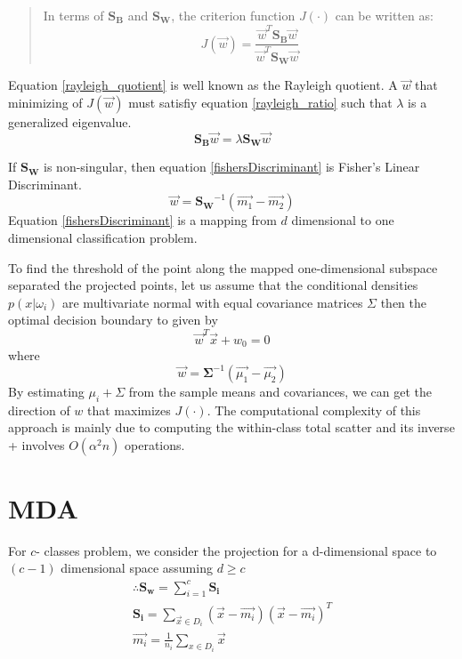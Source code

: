 \documentclass[11pt]{article}
\begin{document}
\begin{quote}
	In terms of $\mathbf{S_B}$ and $\mathbf{S_W}$, the criterion function $J(\cdot)$ can be written as:
	\begin{equation}
		J(\vec{w}) = \frac{\vec{w}^T \mathbf{S_B} \vec{w} } { \vec{w}^T \mathbf{S_W}\vec{w} } \label{rayleigh_quotient}
	\end{equation}
	
\cite[120]{duda-hart-stork}
\end{quote}
Equation \ref{rayleigh_quotient} is well known as the Rayleigh quotient.  A $\vec{w}$ that minimizing of $J(\vec{w})$ must satisfiy equation \ref{rayleigh_ratio} such that $\lambda$ is a generalized eigenvalue.
\begin{equation}
\mathbf{S_B}\vec{w} = \lambda \mathbf{S_W} \vec{w} \label{rayleigh_ratio}
\end{equation}

If $\mathbf{S_W}$ is non-singular, then equation \ref{fishersDiscriminant} is Fisher's Linear Discriminant.
\begin{equation}
	\vec{w} = \mathbf{S_W} ^{-1} (\vec{m_1} - \vec{m_2}) \label{fishersDiscriminant}
\end{equation}
Equation \ref{fishersDiscriminant} is a mapping from $d$ dimensional to one dimensional classification problem.


	To find the threshold of the point along the mapped one-dimensional subspace separated the projected points, let us assume that the conditional densities $p(x | \omega_i)$ are multivariate normal with equal covariance matrices $\Sigma$ then the optimal decision boundary to given by 
\begin{equation}
	\vec{w}^T \vec{x} + w_0 = 0
\end{equation}
where 
\begin{equation}
\vec{w}= \mathbf{\Sigma}^{-1} ( \vec{\mu_1} - \vec{\mu_2})
\end{equation}
By estimating $\mu_i + \Sigma$ from the sample means and covariances, we can get the direction of $w$ that maximizes $J(\cdot)$. The computational complexity of this approach is mainly due to computing the within-class total scatter and its inverse + involves $O(\alpha^2 n)$ operations.  

\section{MDA}
For $c$- classes problem, we consider the projection for a d-dimensional space to $(c-1)$ dimensional space assuming $d \ge c$
\begin{eqnarray}
	\therefore \mathbf{S_w} = \sum_{i=1}^c \mathbf{S_i} \\
	\mathbf{S_i} =  \sum _{\vec{x} \in D_i} (\vec{x} - \vec{m_i} ) (\vec{x} - \vec{m_i} )^T \\
	\vec{m_i} = \frac{1}{n_i} \sum _{x \in D_i} \vec{x}
\end{eqnarray}
\end{document}

